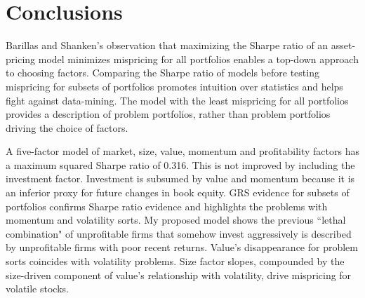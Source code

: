 
\section*{Conclusions}

Barillas and Shanken’s observation that maximizing the Sharpe ratio of an
asset-pricing model minimizes mispricing for all portfolios enables a top-down
approach to choosing factors.
Comparing the Sharpe ratio of models before testing mispricing for subsets of
portfolios promotes intuition over statistics and helps fight against data-mining.
The model with the least mispricing for all portfolios provides a description
of problem portfolios, rather than problem portfolios driving the choice of factors.

A five-factor model of market, size, value, momentum and profitability factors
has a maximum squared Sharpe ratio of 0.316.
This is not improved by including the investment factor.
Investment is subsumed by value and momentum because it is an inferior proxy
for future changes in book equity.
GRS evidence for subsets of portfolios confirms Sharpe ratio evidence and
highlights the problems with momentum and volatility sorts.
My proposed model shows the previous ``lethal combination" of unprofitable
firms that somehow invest aggressively is described by unprofitable firms with
poor recent returns.
Value’s disappearance for problem sorts coincides with volatility problems.
Size factor slopes, compounded by the size-driven component of value's
relationship with volatility, drive mispricing for volatile stocks.

